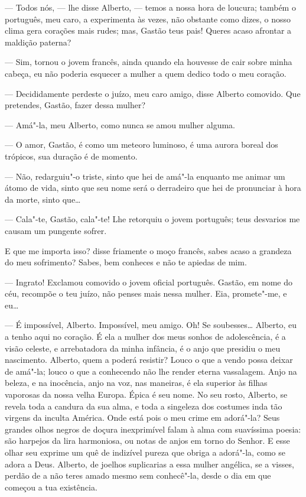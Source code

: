 --- Todos nós, --- lhe disse Alberto, --- temos a nossa hora de loucura;
também o português, meu caro, a experimenta às vezes, não obstante como
dizes, o nosso clima gera corações mais rudes; mas, Gastão teus pais!
Queres acaso afrontar a maldição paterna?

--- Sim, tornou o jovem francês, ainda quando ela houvesse de cair sobre
minha cabeça, eu não poderia esquecer a mulher a quem dedico todo o meu
coração.

--- Decididamente perdeste o juízo, meu caro amigo, disse Alberto
comovido. Que pretendes, Gastão, fazer dessa mulher?

--- Amá"-la, meu Alberto, como nunca se amou mulher alguma.

--- O amor, Gastão, é como um meteoro luminoso, é uma aurora boreal dos
trópicos, sua duração é de momento.

--- Não, redarguiu"-o triste, sinto que hei de amá"-la enquanto me animar
um átomo de vida, sinto que seu nome será o derradeiro que hei de
pronunciar à hora da morte, sinto que\ldots{}

--- Cala"-te, Gastão, cala"-te! Lhe retorquiu o jovem português; teus
desvarios me causam um pungente sofrer.

E que me importa isso? disse friamente o moço francês, sabes acaso a
grandeza do meu sofrimento? Sabes, bem conheces e não te apiedas de mim.

--- Ingrato! Exclamou comovido o jovem oficial português. Gastão, em
nome do céu, recompõe o teu juízo, não penses mais nessa mulher. Eia,
promete"-me, e eu\ldots{}

--- É impossível, Alberto. Impossível, meu amigo. Oh! Se soubesses\ldots{}
Alberto, eu a tenho aqui no coração. É ela a mulher dos meus sonhos de
adolescência, é a visão celeste, e arrebatadora da minha infância, é o
anjo que presidiu o meu nascimento. Alberto, quem a poderá resistir?
Louco o que a vendo possa deixar de amá"-la; louco o que a conhecendo não
lhe render eterna vassalagem. Anjo na beleza, e na inocência, anjo na
voz, nas maneiras, é ela superior às filhas vaporosas da nossa velha
Europa. Épica é seu nome. No seu rosto, Alberto, se revela toda a
candura da sua alma, e toda a singeleza dos costumes inda tão virgens da
inculta América. Onde está pois o meu crime em adorá"-la? Seus grandes
olhos negros de doçura inexprimível falam à alma com suavíssima poesia:
são harpejos da lira harmoniosa, ou notas de anjos em torno do Senhor. E
esse olhar seu exprime um quê de indizível pureza que obriga a adorá"-la,
como se adora a Deus. Alberto, de joelhos suplicarias a essa mulher
angélica, se a visses, perdão de a não teres amado mesmo sem conhecê"-la,
desde o dia em que começou a tua existência.


